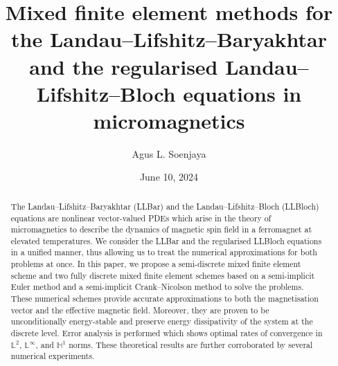 \documentclass[11pt, reqno]{amsart}
\theoremstyle{definition}
\theoremstyle{remark}
\numberwithin{equation}{section}
\newcommand{\bb}{\mathbb}
\begin{document}
\setcounter{page}{1}

\title[Mixed FEM for the LL-Bar and the regularised LL-Bloch equations in micromagnetics]{Mixed finite element methods for the Landau--Lifshitz--Baryakhtar and the regularised Landau--Lifshitz--Bloch equations in micromagnetics}

\author[Agus L. Soenjaya]{Agus L. Soenjaya}
\address{School of Mathematics and Statistics, The University of New South Wales, Sydney 2052, Australia}
\email{\textcolor[rgb]{0.00,0.00,0.84}{a.soenjaya@unsw.edu.au}}

\date{June 10, 2024}



\begin{abstract}
The Landau--Lifshitz--Baryakhtar (LLBar) and the Landau--Lifshitz--Bloch (LLBloch) equations are nonlinear vector-valued PDEs which arise in the theory of micromagnetics to describe the dynamics of magnetic spin field in a ferromagnet at elevated temperatures. We consider the LLBar and the regularised LLBloch equations in a unified manner, thus allowing us to treat the numerical approximations for both problems at once. In this paper, we propose a semi-discrete mixed finite element scheme and two fully discrete mixed finite element schemes based on a semi-implicit Euler method and a semi-implicit Crank--Nicolson method to solve the problems. These numerical schemes provide accurate approximations to both the magnetisation vector and the effective magnetic field. Moreover, they are proven to be unconditionally energy-stable and preserve energy dissipativity of the system at the discrete level. Error analysis is performed which shows optimal rates of convergence in $\bb{L}^2$, $\bb{L}^\infty$, and $\bb{H}^1$ norms. These theoretical results are further corroborated by several numerical experiments.
\end{abstract}
\maketitle
\end{document}
